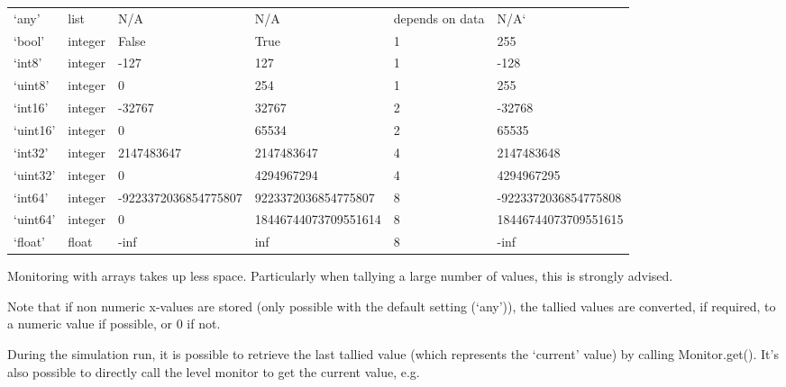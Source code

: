 \documentclass[letterpaper,10pt,english]{sphinxmanual}
\begin{document}
\begin{savenotes}\sphinxattablestart
\centering
\begin{tabulary}{\linewidth}[t]{|T|T|T|T|T|T|}
\hline
{}\relax &\relax &\relax &\relax &\relax &\relax \\
\hline
‘any’
&
list
&
N/A
&
N/A
&
depends on data
&
N/A{}`
\\
\hline
‘bool’
&
integer
&
False
&
True
&
1
&
255
\\
\hline
‘int8’
&
integer
&
-127
&
127
&
1
&
-128
\\
\hline
‘uint8’
&
integer
&
0
&
254
&
1
&
255
\\
\hline
‘int16’
&
integer
&
-32767
&
32767
&
2
&
-32768
\\
\hline
‘uint16’
&
integer
&
0
&
65534
&
2
&
65535
\\
\hline
‘int32’
&
integer
&
2147483647
&
2147483647
&
4
&
2147483648
\\
\hline
‘uint32’
&
integer
&
0
&
4294967294
&
4
&
4294967295
\\
\hline
‘int64’
&
integer
&
-9223372036854775807
&
9223372036854775807
&
8
&
-9223372036854775808
\\
\hline
‘uint64’
&
integer
&
0
&
18446744073709551614
&
8
&
18446744073709551615
\\
\hline
‘float’
&
float
&
-inf
&
inf
&
8
&
-inf
\\
\hline
\end{tabulary}
\par
\sphinxattableend\end{savenotes}

Monitoring with arrays takes up less space. Particularly when tallying a large
number of values, this is strongly advised.

Note that if non numeric x-values are stored (only possible with the default setting (‘any’)),
the tallied values are converted, if required, to a numeric value if possible, or 0 if not.

During the simulation run, it is possible to retrieve the last tallied value (which represents the ‘current’ value)
by calling Monitor.get(). 
It’s also possible to directly call the level monitor to get the current value, e.g.
\end{document}

